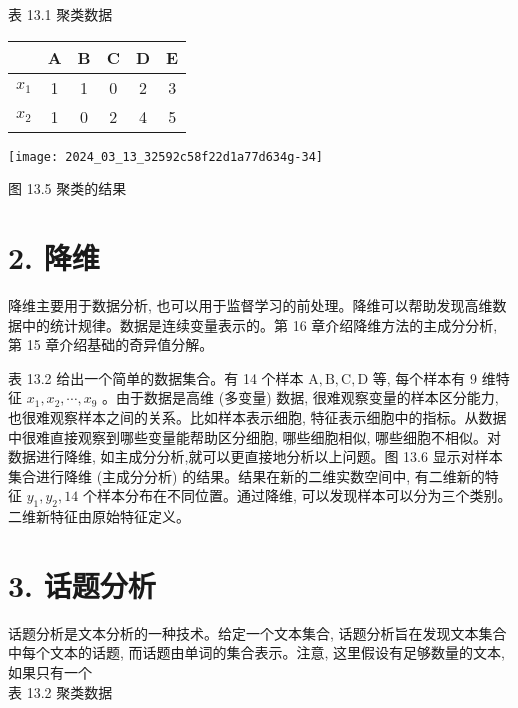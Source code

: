 \documentclass[10pt]{article}
\begin{document}
\begin{CJK*}{UTF8}{bsmi}
表 13.1 聚类数据

\begin{center}
\begin{tabular}{cccccc}
\hline
 & A & B & C & D & E \\
\hline
$x_{1}$ & 1 & 1 & 0 & 2 & 3 \\
$x_{2}$ & 1 & 0 & 2 & 4 & 5 \\
\hline
\end{tabular}
\end{center}

\begin{center}
\texttt{[image: 2024\_03\_13\_32592c58f22d1a77d634g-34]}
\end{center}

图 13.5 聚类的结果

\section*{2. 降维}
降维主要用于数据分析, 也可以用于监督学习的前处理。降维可以帮助发现高维数据中的统计规律。数据是连续变量表示的。第 16 章介绍降维方法的主成分分析, 第 15 章介绍基础的奇异值分解。

表 13.2 给出一个简单的数据集合。有 14 个样本 $\mathrm{A}, \mathrm{B}, \mathrm{C}, \mathrm{D}$ 等, 每个样本有 9 维特征 $x_{1}, x_{2}, \cdots, x_{9}$ 。由于数据是高维 (多变量) 数据, 很难观察变量的样本区分能力, 也很难观察样本之间的关系。比如样本表示细胞, 特征表示细胞中的指标。从数据中很难直接观察到哪些变量能帮助区分细胞, 哪些细胞相似, 哪些细胞不相似。对数据进行降维, 如主成分分析,就可以更直接地分析以上问题。图 13.6 显示对样本集合进行降维 (主成分分析) 的结果。结果在新的二维实数空间中, 有二维新的特征 $y_{1}, y_{2}, 14$ 个样本分布在不同位置。通过降维, 可以发现样本可以分为三个类别。二维新特征由原始特征定义。

\section*{3. 话题分析}
话题分析是文本分析的一种技术。给定一个文本集合, 话题分析旨在发现文本集合中每个文本的话题, 而话题由单词的集合表示。注意, 这里假设有足够数量的文本, 如果只有一个\\
表 13.2 聚类数据


\end{CJK*}
\end{document}
